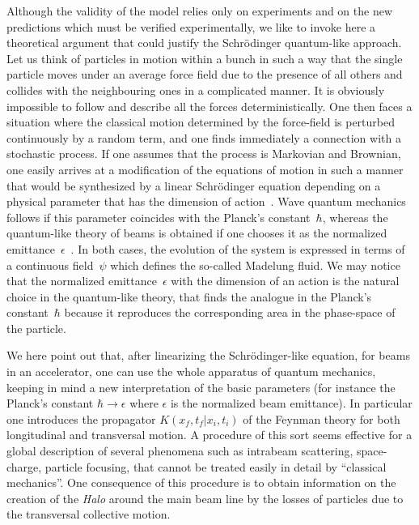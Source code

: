 \documentclass[]{article}
\begin{document}
Although the validity of the model relies only on experiments and on the 
new predictions which must be verified experimentally, we like to invoke 
here a theoretical argument that could justify the Schr\"{o}dinger 
quantum-like approach. Let us think of particles in motion within a bunch 
in such a way that the single particle moves under an average force field 
due to the presence of all others and collides with the neighbouring ones 
in a complicated manner. It is obviously impossible to follow and describe 
all the forces deterministically. One then faces a situation where the 
classical motion determined by the force-field is perturbed continuously 
by a random term, and one finds immediately a connection with a stochastic 
process. If one assumes that the process is Markovian and Brownian, one 
easily arrives at a modification of the equations of motion in such
a manner that would be synthesized by a linear Schr\"{o}dinger equation 
depending on a physical parameter that has the dimension of 
action~\cite{Nelson,Guerra}. Wave quantum mechanics follows if this 
parameter coincides with the Planck's constant~$\hbar$, whereas the 
quantum-like theory of beams is obtained if one chooses it as the 
normalized emittance~$\epsilon$~\cite{Fedele}. In both cases, the 
evolution of the system is expressed in terms of a continuous field~$\psi$
which defines the so-called Madelung fluid. We may notice that the 
normalized emittance~$\epsilon$ with the dimension of an action is the 
natural choice in the quantum-like theory, that finds the analogue in the 
Planck's constant~$\hbar$ because it reproduces the corresponding area in 
the phase-space of the particle.

We here point out that, after linearizing the Schr\"{o}dinger-like
equation, for beams in an accelerator, one can use the whole apparatus
of quantum mechanics, keeping in mind a new interpretation of the basic
parameters (for instance the Planck's constant 
$\hbar \longrightarrow \epsilon$ where $\epsilon$ is the normalized beam 
emittance). In particular one introduces the propagator 
$K \left( x_f , t_f | x_i , t_i \right)$ of the Feynman theory for both 
longitudinal and transversal motion. A procedure of this sort seems 
effective for a global description of several phenomena such 
as intrabeam scattering, space-charge, particle focusing, that cannot be 
treated easily in detail by ``classical mechanics''. One consequence of
this procedure is to obtain information on the creation of the {\em Halo}
around the main beam line by the losses of particles due to the transversal
collective motion.
\end{document}

